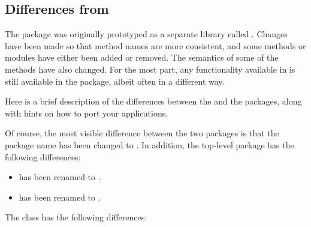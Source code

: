 \subsection{Differences from }

The  package was originally prototyped as a separate
library called
.
Changes have been made so that
method names are more consistent, and some methods or modules have
either been added or removed.  The semantics of some of the methods
have also changed.  For the most part, any functionality available in
 is still available in the  package,
albeit often in a different way.

Here is a brief description of the differences between the
 and the  packages, along with hints on
how to port your applications.

Of course, the most visible difference between the two packages is
that the package name has been changed to .  In
addition, the top-level package has the following differences:

\begin{itemize}
\item {} has been renamed to
      .
\item {} has been renamed to
      .
\end{itemize}

The  class has the following differences:

